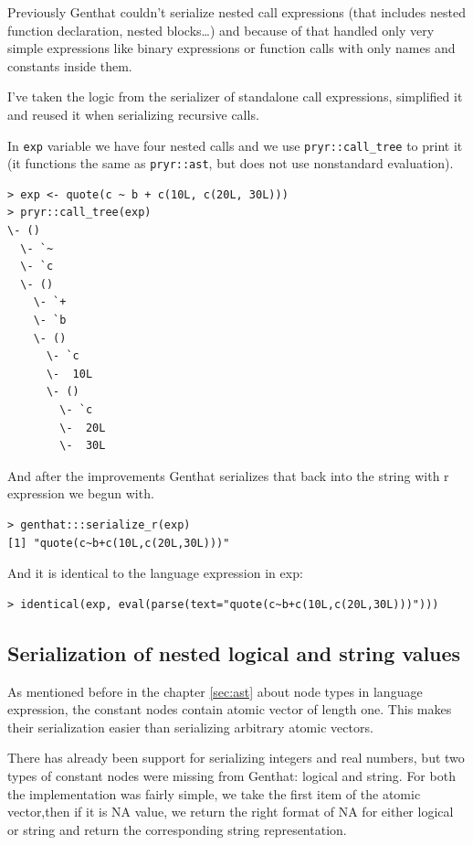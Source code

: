 \documentclass[thesis=B,english]{FITthesis}[2012/10/20]
\begin{document}
Previously Genthat couldn’t serialize nested call expressions (that includes nested function declaration, nested blocks…) and because of that handled only very simple expressions like binary expressions or function calls with only names and constants inside them.

I’ve taken the logic from the serializer of standalone call expressions, simplified it and reused it when serializing recursive calls.

In \verb|exp| variable we have four nested calls and we use \verb|pryr::call_tree| to print it (it functions the same as \verb|pryr::ast|, but does not use nonstandard evaluation).


\begin{verbatim}
> exp <- quote(c ~ b + c(10L, c(20L, 30L)))
> pryr::call_tree(exp)
\- ()
  \- `~
  \- `c
  \- ()
    \- `+
    \- `b
    \- ()
      \- `c
      \-  10L
      \- ()
        \- `c
        \-  20L
        \-  30L
\end{verbatim}

And after the improvements Genthat serializes that back into the string with r expression we begun with.

\begin{verbatim}
> genthat:::serialize_r(exp)
[1] "quote(c~b+c(10L,c(20L,30L)))"
\end{verbatim}

And it is identical to the language expression in exp:

\begin{verbatim}
> identical(exp, eval(parse(text="quote(c~b+c(10L,c(20L,30L)))")))
\end{verbatim}


\subsection{Serialization of nested logical and string values}

As mentioned before in the chapter \ref{sec:ast} about node types in language expression, the constant nodes contain atomic vector of length one. This makes their serialization easier than serializing arbitrary atomic vectors.

There has already been support for serializing integers and real numbers, but two types of constant nodes were missing from Genthat: logical and string. For both the implementation was fairly simple, we take the first item of the atomic vector,then if it is NA value, we return the right format of NA for either logical or string and return the corresponding string representation.
\end{document}
